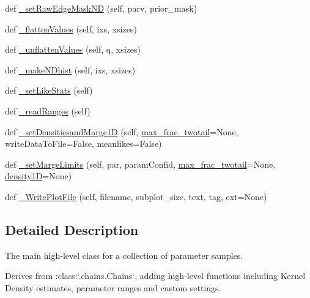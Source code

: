 \begin{DoxyCompactItemize}
\item 
def \mbox{\hyperlink{classgetdist_1_1mcsamples_1_1MCSamples_a07f58b45eeec904f47f0f7f47324c5d0}{\+\_\+set\+Raw\+Edge\+Mask\+ND}} (self, parv, prior\+\_\+mask)
\item 
def \mbox{\hyperlink{classgetdist_1_1mcsamples_1_1MCSamples_a467ece66c344e1e7d4e68f44ea0812f1}{\+\_\+flatten\+Values}} (self, ixs, xsizes)
\item 
def \mbox{\hyperlink{classgetdist_1_1mcsamples_1_1MCSamples_a3847cc1c604f47b2fefca5c9d9d2b28b}{\+\_\+unflatten\+Values}} (self, q, xsizes)
\item 
def \mbox{\hyperlink{classgetdist_1_1mcsamples_1_1MCSamples_a9b4f328726e9e918a2b9a80c7fd614c5}{\+\_\+make\+N\+Dhist}} (self, ixs, xsizes)
\item 
def \mbox{\hyperlink{classgetdist_1_1mcsamples_1_1MCSamples_a9c6887c5c7470e1f684082b0c07f5169}{\+\_\+set\+Like\+Stats}} (self)
\item 
def \mbox{\hyperlink{classgetdist_1_1mcsamples_1_1MCSamples_ac8219d67eb4ca850a314227ff04575d2}{\+\_\+read\+Ranges}} (self)
\item 
def \mbox{\hyperlink{classgetdist_1_1mcsamples_1_1MCSamples_ae22105031ef07db6d65ce05fef3b15e8}{\+\_\+set\+Densitiesand\+Marge1D}} (self, \mbox{\hyperlink{classgetdist_1_1mcsamples_1_1MCSamples_ae1739567d61f29e1887a1012b19dd34c}{max\+\_\+frac\+\_\+twotail}}=None, write\+Data\+To\+File=False, meanlikes=False)
\item 
def \mbox{\hyperlink{classgetdist_1_1mcsamples_1_1MCSamples_a90a8cf01a23a304a6e5fe07db7a74e1a}{\+\_\+set\+Marge\+Limits}} (self, par, param\+Confid, \mbox{\hyperlink{classgetdist_1_1mcsamples_1_1MCSamples_ae1739567d61f29e1887a1012b19dd34c}{max\+\_\+frac\+\_\+twotail}}=None, \mbox{\hyperlink{classgetdist_1_1mcsamples_1_1MCSamples_a603b68a01e150d4186e8f91f3a7f2d65}{density1D}}=None)
\item 
def \mbox{\hyperlink{classgetdist_1_1mcsamples_1_1MCSamples_a7ce3493951d42ba01b959cf3b22b4004}{\+\_\+\+Write\+Plot\+File}} (self, filename, subplot\+\_\+size, text, tag, ext=None)
\end{DoxyCompactItemize}


\subsection{Detailed Description}
\begin{DoxyVerb}The main high-level class for a collection of parameter samples.

Derives from :class:`.chains.Chains`, adding high-level functions including Kernel Density estimates, parameter ranges and custom settings.
\end{DoxyVerb}
 

